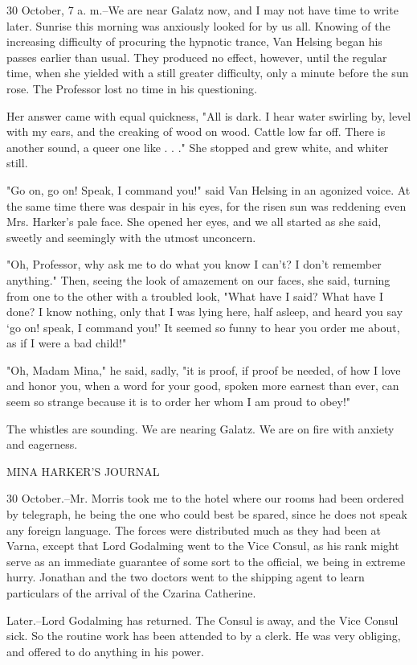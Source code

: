 30 October, 7 a. m.--We are near Galatz now, and I may not have time to write later. Sunrise this morning was anxiously looked for by us all. Knowing of the increasing difficulty of procuring the hypnotic trance, Van Helsing began his passes earlier than usual. They produced no effect, however, until the regular time, when she yielded with a still greater difficulty, only a minute before the sun rose. The Professor lost no time in his questioning. 

Her answer came with equal quickness, "All is dark. I hear water swirling by, level with my ears, and the creaking of wood on wood. Cattle low far off. There is another sound, a queer one like . . ." She stopped and grew white, and whiter still. 

"Go on, go on! Speak, I command you!" said Van Helsing in an agonized voice. At the same time there was despair in his eyes, for the risen sun was reddening even Mrs. Harker's pale face. She opened her eyes, and we all started as she said, sweetly and seemingly with the utmost unconcern. 

"Oh, Professor, why ask me to do what you know I can't? I don't remember anything." Then, seeing the look of amazement on our faces, she said, turning from one to the other with a troubled look, "What have I said? What have I done? I know nothing, only that I was lying here, half asleep, and heard you say `go on! speak, I command you!' It seemed so funny to hear you order me about, as if I were a bad child!" 

"Oh, Madam Mina," he said, sadly, "it is proof, if proof be needed, of how I love and honor you, when a word for your good, spoken more earnest than ever, can seem so strange because it is to order her whom I am proud to obey!" 

The whistles are sounding. We are nearing Galatz. We are on fire with anxiety and eagerness. 

MINA HARKER'S JOURNAL 

30 October.--Mr. Morris took me to the hotel where our rooms had been ordered by telegraph, he being the one who could best be spared, since he does not speak any foreign language. The forces were distributed much as they had been at Varna, except that Lord Godalming went to the Vice Consul, as his rank might serve as an immediate guarantee of some sort to the official, we being in extreme hurry. Jonathan and the two doctors went to the shipping agent to learn particulars of the arrival of the Czarina Catherine. 

Later.--Lord Godalming has returned. The Consul is away, and the Vice Consul sick. So the routine work has been attended to by a clerk. He was very obliging, and offered to do anything in his power. 

